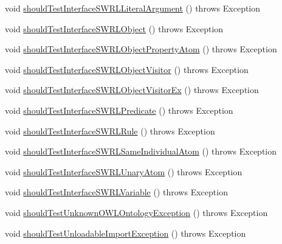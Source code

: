 \begin{DoxyCompactItemize}
\item 
void \hyperlink{classorg_1_1semanticweb_1_1owlapi_1_1contract_1_1_contract_owlapi_model__4_test_ae5425c91891e1cfc8afabedca25d723d}{should\-Test\-Interface\-S\-W\-R\-L\-Literal\-Argument} ()  throws Exception 
\item 
void \hyperlink{classorg_1_1semanticweb_1_1owlapi_1_1contract_1_1_contract_owlapi_model__4_test_a2594255f1b62419fb6573b726114dfc9}{should\-Test\-Interface\-S\-W\-R\-L\-Object} ()  throws Exception 
\item 
void \hyperlink{classorg_1_1semanticweb_1_1owlapi_1_1contract_1_1_contract_owlapi_model__4_test_a32dafaea0a1401285bb0fec7d8eef27d}{should\-Test\-Interface\-S\-W\-R\-L\-Object\-Property\-Atom} ()  throws Exception 
\item 
void \hyperlink{classorg_1_1semanticweb_1_1owlapi_1_1contract_1_1_contract_owlapi_model__4_test_a31299207c2d25a57b28bb08511169153}{should\-Test\-Interface\-S\-W\-R\-L\-Object\-Visitor} ()  throws Exception 
\item 
void \hyperlink{classorg_1_1semanticweb_1_1owlapi_1_1contract_1_1_contract_owlapi_model__4_test_a0c5d92bb6afa2a4ba258275deaef6c40}{should\-Test\-Interface\-S\-W\-R\-L\-Object\-Visitor\-Ex} ()  throws Exception 
\item 
void \hyperlink{classorg_1_1semanticweb_1_1owlapi_1_1contract_1_1_contract_owlapi_model__4_test_a56b9b0c51f26df91d6f8e2b821c44e1d}{should\-Test\-Interface\-S\-W\-R\-L\-Predicate} ()  throws Exception 
\item 
void \hyperlink{classorg_1_1semanticweb_1_1owlapi_1_1contract_1_1_contract_owlapi_model__4_test_a18f562a31a69841a723187567c00dfa3}{should\-Test\-Interface\-S\-W\-R\-L\-Rule} ()  throws Exception 
\item 
void \hyperlink{classorg_1_1semanticweb_1_1owlapi_1_1contract_1_1_contract_owlapi_model__4_test_a459ed171790d2d7e68bd0edc8c7a0758}{should\-Test\-Interface\-S\-W\-R\-L\-Same\-Individual\-Atom} ()  throws Exception 
\item 
void \hyperlink{classorg_1_1semanticweb_1_1owlapi_1_1contract_1_1_contract_owlapi_model__4_test_a3778d6774e0147c6851763e19c80c62c}{should\-Test\-Interface\-S\-W\-R\-L\-Unary\-Atom} ()  throws Exception 
\item 
void \hyperlink{classorg_1_1semanticweb_1_1owlapi_1_1contract_1_1_contract_owlapi_model__4_test_a953d2ddb8378c68e72373b5452607934}{should\-Test\-Interface\-S\-W\-R\-L\-Variable} ()  throws Exception 
\item 
void \hyperlink{classorg_1_1semanticweb_1_1owlapi_1_1contract_1_1_contract_owlapi_model__4_test_a46e26a02667cfa03dc6156dc6d2f9faf}{should\-Test\-Unknown\-O\-W\-L\-Ontology\-Exception} ()  throws Exception 
\item 
void \hyperlink{classorg_1_1semanticweb_1_1owlapi_1_1contract_1_1_contract_owlapi_model__4_test_a9f5cc31357038d4c22d50922fcc4d238}{should\-Test\-Unloadable\-Import\-Exception} ()  throws Exception 
\end{DoxyCompactItemize}



